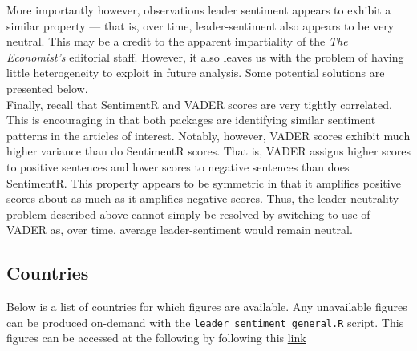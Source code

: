 \documentclass[11pt, letterpaper, twoside]{article}
\begin{document}
More importantly however, observations leader sentiment appears to exhibit a similar property --- that is, over time, leader-sentiment also appears to be very neutral. This may be a credit to the apparent impartiality of the \textit{The Economist's} editorial staff. However, it also leaves us with the problem of having little heterogeneity to exploit in future analysis. Some potential solutions are presented below.\\

Finally, recall that SentimentR and VADER scores are very tightly correlated. This is encouraging in that both packages are identifying similar sentiment patterns in the articles of interest. Notably, however, VADER scores exhibit much higher variance than do SentimentR scores. That is, VADER assigns higher scores to positive sentences and lower scores to negative sentences than does SentimentR. This property appears to be symmetric in that it amplifies positive scores about as much as it amplifies negative scores. Thus, the leader-neutrality problem described above cannot simply be resolved by switching to use of VADER as, over time, average leader-sentiment would remain neutral.

\subsection{Countries}
Below is a list of countries for which figures are available. Any unavailable figures can be produced on-demand with the \texttt{leader\_sentiment\_general.R} script. This figures can be accessed at the following by following this \href{https://github.com/joshuaylevy/leaderSentimentEarnings/tree/jyl-vader-Economist-alias/00_README_DOCUMENTATION/figures}{link}
\end{document}
